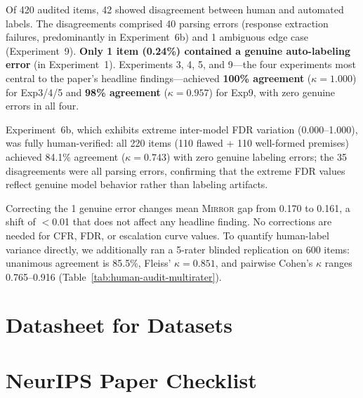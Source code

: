 \documentclass[10pt]{article}
\newcommand{\mirror}{\textsc{Mirror}}
\newcommand{\CFR}{CFR}
\newcommand{\FDR}{FDR}
\begin{document}
Of 420 audited items, 42 showed disagreement between human and automated labels.
The disagreements comprised 40 parsing errors (response extraction failures, predominantly in Experiment~6b) and 1 ambiguous edge case (Experiment~9). \textbf{Only 1 item (0.24\%) contained a genuine auto-labeling error} (in Experiment~1).
Experiments 3, 4, 5, and 9---the four experiments most central to the paper's headline findings---achieved \textbf{100\% agreement} ($\kappa = 1.000$) for Exp3/4/5 and \textbf{98\% agreement} ($\kappa = 0.957$) for Exp9, with zero genuine errors in all four.

Experiment~6b, which exhibits extreme inter-model FDR variation (0.000--1.000),
was fully human-verified: all 220 items (110 flawed + 110 well-formed premises)
achieved 84.1\% agreement ($\kappa = 0.743$) with zero genuine labeling errors; the 35 disagreements
were all parsing errors, confirming that the extreme FDR values
reflect genuine model behavior rather than labeling artifacts.

Correcting the 1 genuine error changes mean \mirror{} gap from 0.170 to 0.161,
a shift of $<$0.01 that does not affect any headline finding. No corrections are
needed for \CFR{}, \FDR{}, or escalation curve values. To quantify human-label
variance directly, we additionally ran a 5-rater blinded replication on 600
items: unanimous agreement is 85.5\%, Fleiss' $\kappa=0.851$, and pairwise
Cohen's $\kappa$ ranges 0.765--0.916 (Table~\ref{tab:human-audit-multirater}).

\section{Datasheet for Datasets}
\label{app:datasheet}



\newpage
\section*{NeurIPS Paper Checklist}
\end{document}
